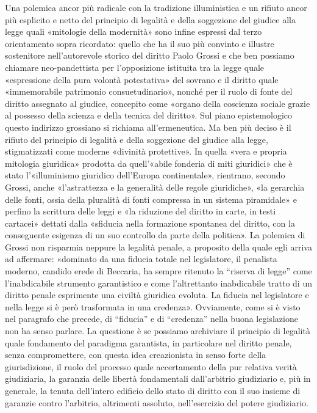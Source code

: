 Una polemica ancor più radicale con la tradizione illuministica e un rifiuto ancor più esplicito e netto del principio di legalità e della soggezione del giudice alla legge quali «mitologie della modernità» sono infine espressi dal terzo orientamento sopra ricordato: quello che ha il suo più convinto e illustre sostenitore nell’autorevole storico del diritto Paolo Grossi e che ben possiamo chiamare neo-pandettista per l’opposizione istituita tra la legge quale «espressione della pura volontà potestativa» del sovrano e il diritto quale «immemorabile patrimonio consuetudinario», nonché per il ruolo di fonte del diritto assegnato al giudice, concepito come «organo della coscienza sociale grazie al possesso della scienza e della tecnica del diritto». Sul piano epistemologico questo indirizzo grossiano si richiama all’ermeneutica. Ma ben più deciso è il rifiuto del principio di legalità e della soggezione del giudice alla legge, stigmatizzati come moderne «divinità protettive». In quella «vera e propria mitologia giuridica» prodotta da quell’«abile fonderia di miti giuridici» che è stato l’«illuminismo giuridico dell’Europa continentale», rientrano, secondo Grossi, anche «l’astrattezza e la generalità delle regole giuridiche», «la gerarchia delle fonti, ossia della pluralità di fonti compressa in un sistema piramidale» e perfino la scrittura delle leggi e «la riduzione del diritto in carte, in testi cartacei» dettati dalla «sfiducia nella formazione spontanea del diritto, con la conseguente esigenza di un suo controllo da parte della politica». La polemica di Grossi non risparmia neppure la legalità penale, a proposito della quale egli arriva ad affermare: «dominato da una fiducia totale nel legislatore, il penalista moderno, candido erede di Beccaria, ha sempre ritenuto la “riserva di legge” come l’inabdicabile strumento garantistico e come l’altrettanto inabdicabile tratto di un diritto penale esprimente una civiltà giuridica evoluta. La fiducia nel legislatore e nella legge si è però trasformata in una credenza». Ovviamente, come si è visto nel paragrafo che precede, di “fiducia” e di “credenza” nella buona legislazione non ha senso parlare. La questione è se possiamo archiviare il principio di legalità quale fondamento del paradigma garantista, in particolare nel diritto penale, senza compromettere, con questa idea creazionista in senso forte della giurisdizione, il ruolo del processo quale accertamento della pur relativa verità giudiziaria, la garanzia delle libertà fondamentali dall’arbitrio giudiziario e, più in generale, la tenuta dell’intero edificio dello stato di diritto con il suo insieme di garanzie contro l’arbitrio, altrimenti assoluto, nell’esercizio del potere giudiziario.
